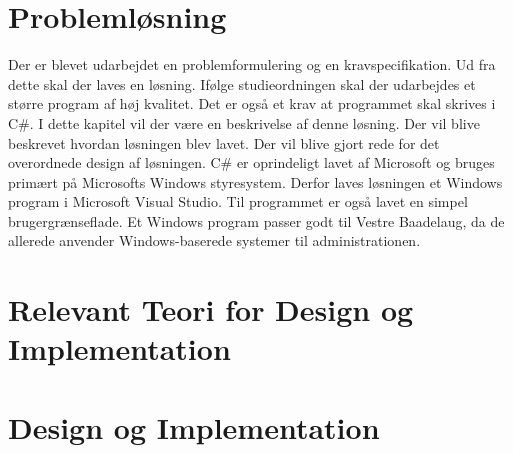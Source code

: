 \chapter{Problemløsning}
\label{cha:problemlosning}

Der er blevet udarbejdet en problemformulering og en kravspecifikation. Ud fra dette skal der laves en løsning. Ifølge studieordningen skal der udarbejdes et større program af høj kvalitet. Det er også et krav at programmet skal skrives i C\#. I dette kapitel vil der være en beskrivelse af denne løsning. Der vil blive beskrevet hvordan løsningen blev lavet. Der vil blive gjort rede for det overordnede design af løsningen. C\# er oprindeligt lavet af Microsoft og bruges primært på Microsofts Windows styresystem. Derfor laves løsningen et Windows program i Microsoft Visual Studio. Til programmet er også lavet en simpel brugergrænseflade. Et Windows program passer godt til Vestre Baadelaug, da de allerede anvender Windows-baserede systemer til administrationen.




\chapter{Relevant Teori for Design og Implementation}




\chapter{Design og Implementation}

















%
